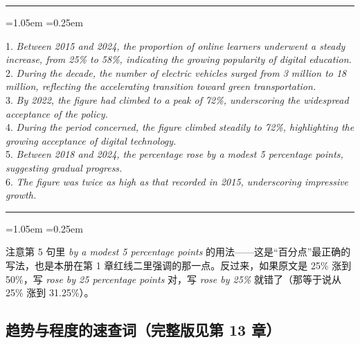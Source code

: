 \documentclass[11pt,a4paper]{ctexart}
\newcommand{\en}[1]{\textit{#1}}
\newenvironment{tpl}[1]{%
  \par\addvspace{7pt}\needspace{4\baselineskip}%
  \noindent{\bfseries\color{accent}#1}\par\nopagebreak
  \vspace{2pt}\noindent\rule{\linewidth}{0.7pt}\par\nopagebreak\vspace{3pt}%
  \begin{list}{}{\leftmargin=1.05em \rightmargin=0.25em \listparindent=0pt
    \itemindent=0pt \topsep=0pt \parsep=2.5pt \itemsep=2.5pt \partopsep=0pt}%
  \item\relax
}{%
  \end{list}\vspace{1pt}\noindent\rule{\linewidth}{0.7pt}\par\addvspace{8pt}%
}
\newenvironment{note}{%
  \par\addvspace{5pt}%
  \begin{list}{}{\leftmargin=1.05em \rightmargin=0.25em \listparindent=0pt
    \itemindent=0pt \topsep=0pt \parsep=2pt \itemsep=2pt \partopsep=0pt}%
  \item\relax\small\color{ink}%
}{%
  \end{list}\addvspace{5pt}%
}
\begin{document}
\begin{tpl}{六件套的六个成品（全部可直接替换）}
1. \en{Between 2015 and 2024, the proportion of online learners underwent a steady increase, from 25\% to 58\%, indicating the growing popularity of digital education.}\\[2pt]
2. \en{During the decade, the number of electric vehicles surged from 3 million to 18 million, reflecting the accelerating transition toward green transportation.}\\[2pt]
3. \en{By 2022, the figure had climbed to a peak of 72\%, underscoring the widespread acceptance of the policy.}\\[2pt]
4. \en{During the period concerned, the figure climbed steadily to 72\%, highlighting the growing acceptance of digital technology.}\\[2pt]
5. \en{Between 2018 and 2024, the percentage rose by a modest 5 percentage points, suggesting gradual progress.}\\[2pt]
6. \en{The figure was twice as high as that recorded in 2015, underscoring impressive growth.}
\end{tpl}

\begin{note}
注意第 5 句里 \en{by a modest 5 percentage points} 的用法——这是“百分点”最正确的写法，也是本册在第 1 章红线二里强调的那一点。反过来，如果原文是 25\% 涨到 50\%，写 \en{rose by 25 percentage points} 对，写 \en{rose by 25\%} 就错了（那等于说从 25\% 涨到 31.25\%）。
\end{note}

\subsection{趋势与程度的速查词（完整版见第 13 章）}
\end{document}
